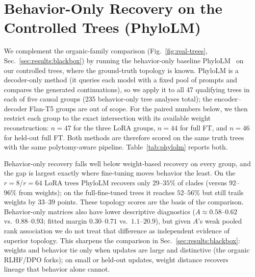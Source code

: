 \documentclass{article}
\theoremstyle{definition}
\theoremstyle{plain}
\begin{document}
\section{Behavior-Only Recovery on the Controlled Trees (PhyloLM)}
\label{app:phylolm}

We complement the organic-family comparison (Fig.~\ref{fig:real-trees},
Sec.~\ref{sec:results:blackbox}) by running the behavior-only baseline PhyloLM~\citep{yax2025phylolm}
on our controlled trees, where the ground-truth topology is known. PhyloLM is a decoder-only method
(it queries each model with a fixed pool of prompts and compares the generated continuations), so we
apply it to all 47 qualifying trees in each of five causal groups (235 behavior-only tree analyses
total); the encoder--decoder Flan-T5 groups are out of scope. For the paired numbers below, we then
restrict each group to the exact intersection with its available weight reconstruction: $n=47$ for
the three LoRA groups, $n=44$ for full FT, and $n=46$ for held-out full FT. Both methods are therefore
scored on the same truth trees with the same polytomy-aware pipeline. Table~\ref{tab:phylolm} reports both.

Behavior-only recovery falls well below weight-based recovery on every group, and the gap is largest
exactly where fine-tuning moves behavior the least. On the $r{=}8$/$r{=}64$ LoRA trees PhyloLM
recovers only $29$--$35\%$ of clades (versus $92$--$96\%$ from weights); on the full-fine-tuned trees
it reaches $52$--$56\%$ but still trails weights by $33$--$39$ points. These topology scores are the
basis of the comparison. Behavior-only matrices also have lower descriptive diagnostics
($A\approx 0.58$--$0.62$ vs.\ $0.88$--$0.93$; fitted margin $0.30$--$0.71$ vs.\ $1.1$--$20.9$), but
given $A$'s weak pooled rank association we do not treat that difference as independent evidence of
superior topology. This sharpens the comparison in
Sec.~\ref{sec:results:blackbox}: weights and behavior tie only when updates are large and distinctive
(the organic RLHF/DPO forks); on small or held-out updates, weight distance recovers lineage that
behavior alone cannot.
\end{document}
